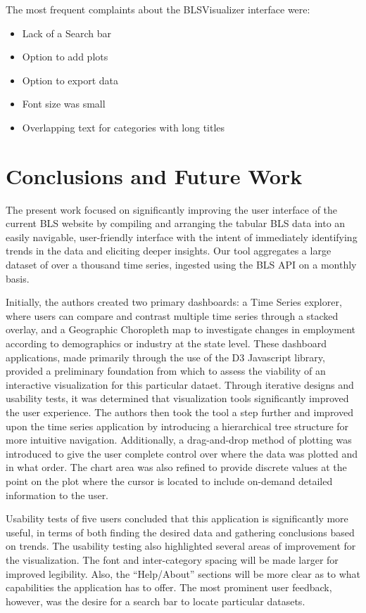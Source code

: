 \documentclass{sigchi}
\begin{document}
The most frequent complaints about the BLSVisualizer interface were:

\begin{itemize}
  \item Lack of a Search bar
  \item Option to add plots
  \item Option to export data
  \item Font size was small
  \item Overlapping text for categories with long titles
\end{itemize}


\section{Conclusions and Future Work}

The present work focused on significantly improving the user interface of the current BLS website by compiling and arranging the tabular BLS data into an easily navigable, user-friendly interface with the intent of immediately identifying trends in the data and eliciting deeper insights. Our tool aggregates a large dataset of over a thousand time series, ingested using the BLS API on a monthly basis.

Initially, the authors created two primary dashboards: a Time Series explorer, where users can compare and contrast multiple time series through a stacked overlay, and a Geographic Choropleth map to investigate changes in employment according to demographics or industry at the state level. These dashboard applications, made primarily through the use of the D3 Javascript library,  provided a preliminary foundation from which to assess the viability of an interactive visualization for this particular dataet. Through iterative designs and usability tests, it was determined that visualization tools significantly improved the user experience. The authors then took the tool a step further and improved upon the time series application by introducing a hierarchical tree structure for more intuitive navigation. Additionally, a drag-and-drop method of plotting was introduced to give the user complete control over where the data was plotted and in what order. The chart area was also refined to provide discrete values at the point on the plot where the cursor is located to include on-demand detailed information to the user.

Usability tests of five users concluded that this application is significantly more useful, in terms of both finding the desired data and gathering conclusions based on trends. The usability testing also highlighted several areas of improvement for the visualization. The font and inter-category spacing will be made larger for improved legibility. Also, the ``Help/About'' sections will be more clear as to what capabilities the application has to offer. The most prominent user feedback, however, was the desire for a search bar to locate particular datasets.
\end{document}

